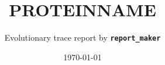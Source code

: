 \documentclass{reportmaker}
\begin{document}
   

\title[PROTEINNAME]{\bf PROTEINNAME}
\author [ET report]{ Evolutionary trace report by {\tt \bf report\_maker}}
\address{}
\date{\today}
\maketitle
\end{document}
